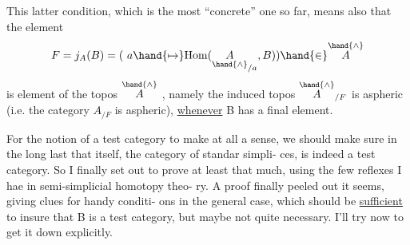 This latter condition,  which is the most ``concrete'' one so far,
means also that the element
\[ F = j_A(B) = (\ a \hand{\mapsto} \mathrm{Hom}(\underset{\hand{\wedge}}{A}_{/a},B)) \hand{\in} \overset{\hand{\wedge}}{A} \]
is    element of the topos $\overset{\hand{\wedge}}{A}$ ,  namely  the induced topos $\overset{\hand{\wedge}}{A}_{/F}$ is
aspheric (i.e. the category $A_{/F}$  is aspheric),  \uline{whenever} B has a final
element.

  For the notion of a test category to make at all a sense,  we should
make sure in the long last that \hand{$\Delta$} itself,  the category of standar simpli-%
ces,  is indeed a test category.  So I finally set out to prove at least
\margin{$\times$} that much,  using the few reflexes I hae in semi-simplicial homotopy theo-%
ry.  A proof finally peeled out it seems,  giving clues for handy conditi-%
ons in the general case,  which should be \uline{sufficient}  to insure
that B is a test category,  but maybe not quite necessary.  I'll try now
to get it down explicitly.
